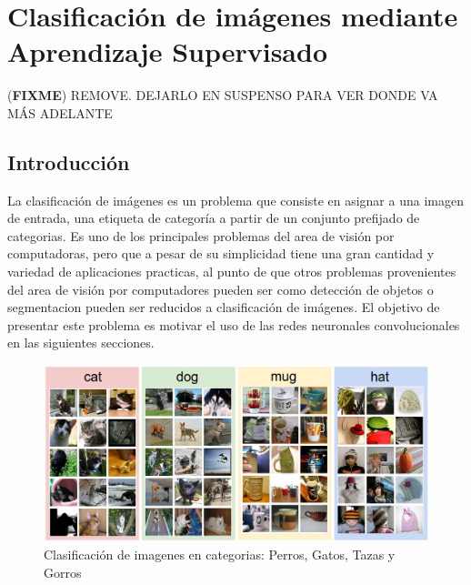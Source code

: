 \documentclass[a4paper,11pt,spanish]{book}
\newcommand*{\FIXME}[1]{{(\textbf{FIXME}) {#1}}}
\begin{document}
\iffalse

    \section{Clasificación de imágenes mediante Aprendizaje
      Supervisado}\FIXME{REMOVE. DEJARLO EN SUSPENSO PARA VER DONDE VA MÁS ADELANTE}
      \subsection{Introducción}
	La clasificación de imágenes es un problema que consiste en asignar a una imagen de entrada, una etiqueta de categoría a partir de un conjunto prefijado de categorias.
	Es uno de los principales problemas del area de visión por computadoras, pero que a pesar de su simplicidad tiene una gran cantidad y variedad de aplicaciones practicas,
	al punto de que otros problemas provenientes del area de visión por computadores pueden ser como detección de objetos o segmentacion pueden ser reducidos a clasificación de imágenes.
	El objetivo de presentar este problema es motivar el uso de las redes neuronales convolucionales en las siguientes secciones.
	\begin{figure}[h]
	  \includegraphics[scale=0.5]{./img/stanford_img_class.jpg}
	  \caption{Clasificación de imagenes en categorias: Perros, Gatos, Tazas y Gorros}
	  \label{fig:stanford_img_class}
	\end{figure}
\end{document}
